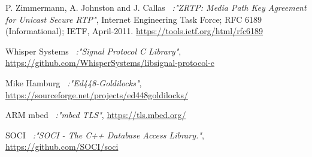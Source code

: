\documentclass[a4paper,11pt]{article}
\begin{document}
\begin{thebibliography}{99}
  P. Zimmermann, A. Johnston and J. Callas
  \textit{\ :"ZRTP: Media Path Key Agreement for Unicast Secure RTP"},
  Internet Engineering Task Force; RFC 6189 (Informational); IETF, April-2011.
  \href{https://tools.ietf.org/html/rfc6189}{https://tools.ietf.org/html/rfc6189}

  Whisper Systems
  \textit{\ :"Signal Protocol C Library"},
  \href{https://github.com/WhisperSystems/libsignal-protocol-c}{https://github.com/WhisperSystems/libsignal-protocol-c}

  Mike Hamburg
  \textit{\ :"Ed448-Goldilocks"},
  \href{https://sourceforge.net/projects/ed448goldilocks/}{https://sourceforge.net/projects/ed448goldilocks/}
  
  ARM mbed
  \textit{\ :"mbed TLS"},
  \href{https://tls.mbed.org/}{https://tls.mbed.org/}
  
  SOCI
  \textit{\ :"SOCI - The C++ Database Access Library."},
  \href{https://github.com/SOCI/soci}{https://github.com/SOCI/soci}
\end{thebibliography}
\end{document}
